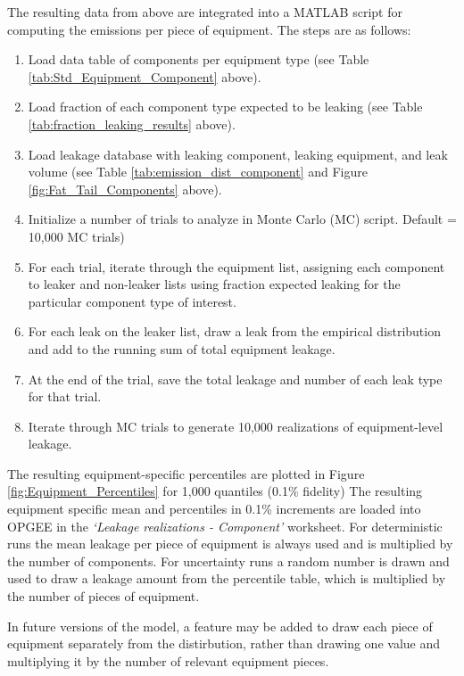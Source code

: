 \documentclass[11pt]{report}
\newcommand{\sheet}[1]{\textit{`{#1}'}}
\begin{document}
The resulting data from above are integrated into a MATLAB script for computing the emissions per piece of equipment.  The steps are as follows:
\begin{enumerate}
\item Load data table of components per equipment type (see Table \ref{tab:Std_Equipment_Component} above).
\item Load fraction of each component type expected to be leaking (see Table \ref{tab:fraction_leaking_results} above).
\item Load leakage database with leaking component, leaking equipment, and leak volume (see Table \ref{tab:emission_dist_component}  and Figure \ref{fig:Fat_Tail_Components} above).
\item Initialize a number of trials to analyze in Monte Carlo (MC) script. Default = 10,000 MC trials)
\item For each trial, iterate through the equipment list, assigning each component to leaker and non-leaker lists using fraction expected leaking for the particular component type of interest.
\item For each leak on the leaker list, draw a leak from the empirical distribution and add to the running sum of total equipment leakage.
\item At the end of the trial, save the total leakage and number of each leak type for that trial.
\item Iterate through MC trials to generate 10,000 realizations of equipment-level leakage.
\end{enumerate}

The resulting equipment-specific percentiles are plotted in Figure \ref{fig:Equipment_Percentiles} for 1,000 quantiles (0.1\% fidelity) The resulting equipment specific mean and percentiles in 0.1\% increments are loaded into OPGEE in the \sheet{Leakage realizations - Component} worksheet.  For deterministic runs the mean leakage per piece of equipment is always used and is multiplied by the number of components. For uncertainty runs a random number is drawn and used to draw a leakage amount from the percentile table, which is multiplied by the number of pieces of equipment.

In future versions of the model, a feature may be added to draw each piece of equipment separately from the distirbution, rather than drawing one value and multiplying it by the number of relevant equipment pieces.
\end{document}
